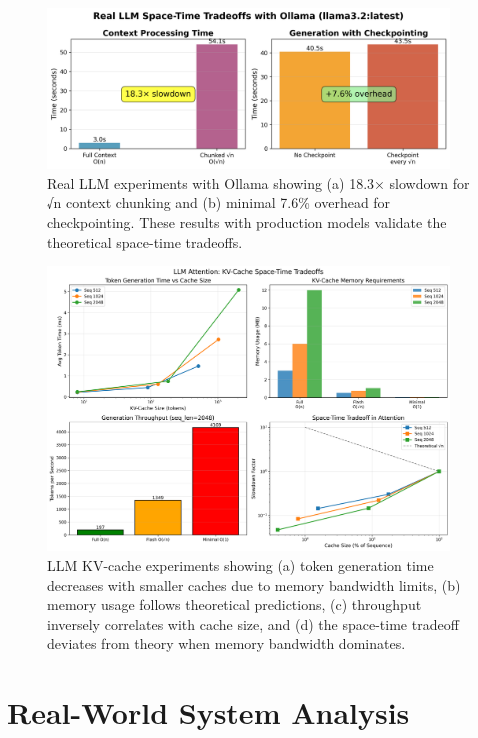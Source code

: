 \documentclass[11pt]{article}
\theoremstyle{definition}
\begin{document}
\begin{figure}[htbp]
\centering
\includegraphics[width=0.95\textwidth]{figures/ollama_spacetime_results.png}
\caption{Real LLM experiments with Ollama showing (a) 18.3× slowdown for √n context chunking and (b) minimal 7.6\% overhead for checkpointing. These results with production models validate the theoretical space-time tradeoffs.}
\label{fig:ollama_results}
\end{figure}

\begin{figure}[htbp]
\centering
\includegraphics[width=0.95\textwidth]{figures/llm_attention_tradeoff.png}
\caption{LLM KV-cache experiments showing (a) token generation time decreases with smaller caches due to memory bandwidth limits, (b) memory usage follows theoretical predictions, (c) throughput inversely correlates with cache size, and (d) the space-time tradeoff deviates from theory when memory bandwidth dominates.}
\label{fig:llm_tradeoff}
\end{figure}

\section{Real-World System Analysis}
\label{sec:systems}
\end{document}
